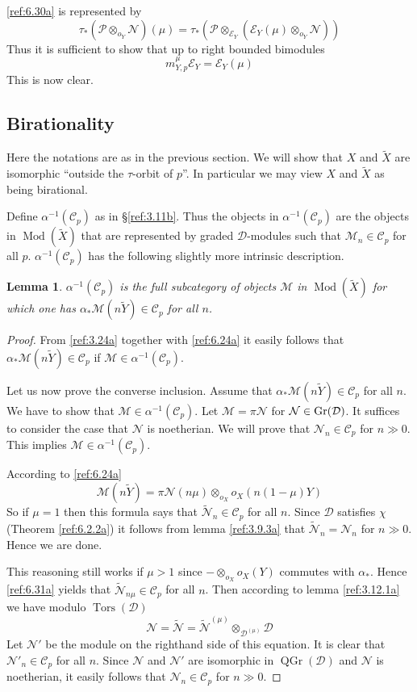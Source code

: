 \documentclass{amsproc}
\def\Cscr{{\mathcal C}}
\def\Dscr{{\mathcal D}}
\def\Escr{{\mathcal E}}
\def\Mscr{{\mathcal M}}
\def\Nscr{{\mathcal N}}
\def\Pscr{{\mathcal P}}
\def\Gr{\mathop{\text{Gr}}}
\def\Tors{\operatorname{Tors}}
\def\Tors{\operatorname {Tors}}
\def\Qch{\operatorname {Mod}}
\let\oldtext\text
\def\text#1{\oldtext{\upshape #1}}
\DeclareMathOperator{\QGr}{QGr}
\newtheorem{lemmas}{Lemma}[subsection]
\theoremstyle{definition}
\theoremstyle{remark}
\numberwithin{equation}{section}
\numberwithin{table}{section}
\numberwithin{figure}{section}
\def\Gr{\mathop{\text{Gr}}}
\begin{document}
\eqref{ref:6.30a} is represented by 
\[
\tau_\ast(\Pscr\otimes_{o_Y}\Nscr)(\mu)=\tau_\ast(\Pscr
\otimes_{\Escr_Y}(\Escr_Y(\mu)\otimes_{o_Y}\Nscr))
\]
Thus it is sufficient to show that up to right bounded bimodules
\[
m^\mu_{Y,p}
\Escr_Y=\Escr_Y(\mu)
\]
This is now clear.



\subsection{Birationality}
\label{ref:6.5b}
Here the notations are as in the previous section. We will show that $X$
and ${\tilde{X}}$ are isomorphic ``outside the $\tau$-orbit of $p$''. In particular
we may view $X$ and ${\tilde{X}}$ as being birational.

Define 
$\alpha^{-1}(\Cscr_p)$ as in \S\ref{ref:3.11b}. Thus the objects in
$\alpha^{-1}(\Cscr_p)$ are the objects in $\Qch({\tilde{X}})$ that are represented
by graded $\Dscr$-modules such that $\Mscr_n\in\Cscr_p$ for all $p$. 
$\alpha^{-1}(\Cscr_p)$ has the following slightly more intrinsic
description.
\begin{lemmas} 
\label{ref:6.5.1a}
$\alpha^{-1}(\Cscr_p)$ is the full subcategory of objects $\Mscr$ in
$\Qch({\tilde{X}})$ for which one  has $\alpha_\ast\Mscr(n{\tilde{Y}})\in\Cscr_p$ for all $n$.
\end{lemmas}
\begin{proof} 
From \eqref{ref:3.24a} together with \eqref{ref:6.24a} it easily follows
that $\alpha_\ast\Mscr(n{\tilde{Y}})\in\Cscr_p$ if
$\Mscr\in\alpha^{-1}(\Cscr_p)$. 

Let us now prove the converse inclusion.
Assume  that $\alpha_\ast\Mscr(n{\tilde{Y}})\in\Cscr_p$ for all $n$. We have to show that
$\Mscr\in\alpha^{-1}(\Cscr_p)$. Let $\Mscr=\pi\Nscr$ for
$\Nscr\in\Gr(\Dscr)$. It suffices to consider the case that
$\Nscr$ is noetherian. We will prove that $\Nscr_n\in\Cscr_p$ for $n\gg
0$. This implies $\Mscr\in\alpha^{-1}(\Cscr_p)$.



According to \eqref{ref:6.24a} 
\begin{equation}
\label{ref:6.31a}
\Mscr(n{\tilde{Y}})=\pi\Nscr(n\mu)\otimes_{o_X}o_X(n(1-\mu)Y)
\end{equation}
So if $\mu=1$ then this formula says that $\tilde{\Nscr}_n\in\Cscr_p$
for all $n$. Since $\Dscr$ satisfies $\chi$ (Theorem 
\ref{ref:6.2.2a}) it follows from lemma \ref{ref:3.9.3a} 
that $\tilde{\Nscr}_n=\Nscr_n$ for
$n\gg 0$. Hence we are done.

This reasoning still works if $\mu>1$ since $-\otimes_{o_X}o_X(Y)$
commutes with $\alpha_\ast$. Hence \eqref{ref:6.31a} yields that
$\tilde{\Nscr}_{n\mu}\in\Cscr_p$ for all $n$. Then according to lemma
\ref{ref:3.12.1a} we have  modulo $\Tors(\Dscr)$
\[
\Nscr=\tilde{\Nscr}=\tilde{\Nscr}^{(\mu)}\otimes_{\Dscr^{(\mu)}}\Dscr
\]
Let $\Nscr'$ be the module on the righthand side of this equation. It is
clear that $\Nscr'_n\in\Cscr_p$ for all $n$. Since $\Nscr$ and $\Nscr'$
are isomorphic in $\QGr(\Dscr)$ and $\Nscr$ is noetherian, it easily
follows that $\Nscr_n\in\Cscr_p$ for $n\gg 0$.
\end{proof}
\end{document}
